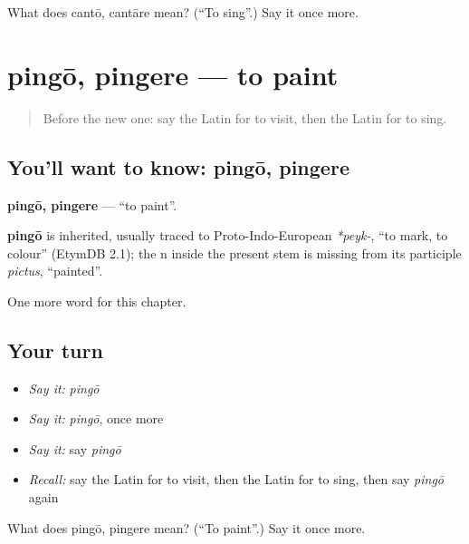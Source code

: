 \begin{tcolorbox}[breakable,colback=teal!4,colframe=teal!35!black,title={Before you move on}]
What does cantō, cantāre mean? (\textquotedblleft{}To sing\textquotedblright{}.) Say it once more.
\end{tcolorbox}
\section[pingō, pingere]{pingō, pingere — to paint}

\label{lesson:LA-C154-pingo}



\begin{quote}
Before the new one: say the Latin for to visit, then the Latin for to sing.
\end{quote}

\subsection*{You'll want to know: pingō, pingere}
\textbf{pingō, pingere} — \textquotedblleft{}to paint\textquotedblright{}.

\begin{cousinweb}
\textbf{pingō} is inherited, usually traced to Proto-Indo-European \emph{*peyk-}, \textquotedblleft{}to mark, to colour\textquotedblright{} (EtymDB 2.1); the n inside the present stem is missing from its participle \emph{pictus}, \textquotedblleft{}painted\textquotedblright{}.
\end{cousinweb}

\begin{grammarlens}[title={What you've built}]
One more word for this chapter.
\end{grammarlens}

\subsection*{Your turn}
\begin{itemize}
\raggedright
  \item \emph{Say it:} \emph{pingō}
  \item \emph{Say it:} \emph{pingō}, once more
  \item \emph{Say it:} say \emph{pingō}
  \item \emph{Recall:} say the Latin for to visit, then the Latin for to sing, then say \emph{pingō} again
\end{itemize}

\begin{tcolorbox}[breakable,colback=teal!4,colframe=teal!35!black,title={Before you move on}]
What does pingō, pingere mean? (\textquotedblleft{}To paint\textquotedblright{}.) Say it once more.
\end{tcolorbox}
